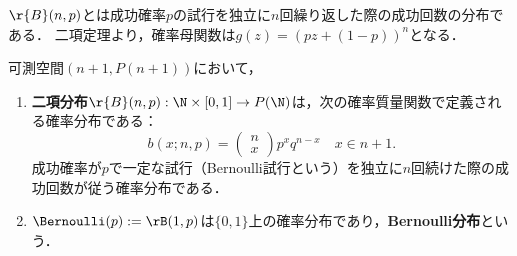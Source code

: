 \documentclass[uplatex,dvipdfmx]{jsreport}
\begin{document}
\begin{tcolorbox}[colframe=ForestGreen, colback=ForestGreen!10!white,breakable,colbacktitle=ForestGreen!40!white,coltitle=black,fonttitle=\bfseries\sffamily,
title=]
    $\r{B}(n,p)$とは成功確率$p$の試行を独立に$n$回繰り返した際の成功回数の分布である．
    二項定理より，確率母関数は$g(z)=(pz+(1-p))^n$となる．
\end{tcolorbox}

\begin{definition}
    可測空間$(n+1,P(n+1))$において，
    \begin{enumerate}
        \item \textbf{二項分布}$\r{B}(n,p):\N\times[0,1]\to P(\N)$は，次の確率質量関数で定義される確率分布である：
        \[b(x;n,p)=\begin{pmatrix}n\\x\end{pmatrix}p^xq^{n-x}\quad x\in n+1.\]
        成功確率が$p$で一定な試行（Bernoulli試行という）を独立に$n$回続けた際の成功回数が従う確率分布である．
        \item $\Bernoulli(p):=\rB(1,p)$は$\{0,1\}$上の確率分布であり，\textbf{Bernoulli分布}という．
    \end{enumerate}
\end{definition}
\end{document}
